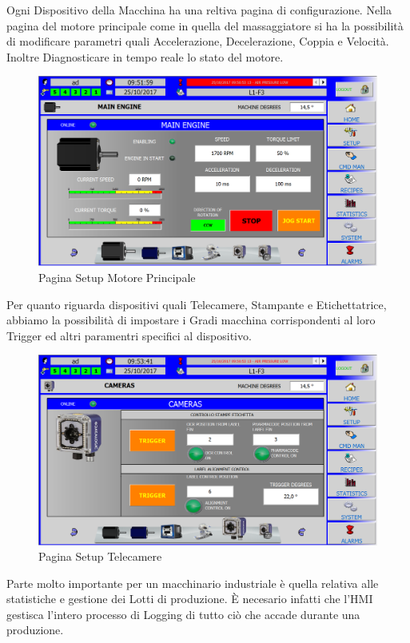 \documentclass[12pt, a4paper, oneside]{book}
\begin{document}
Ogni Dispositivo della Macchina ha una reltiva pagina di configurazione. Nella pagina del motore principale come in quella del massaggiatore si ha la possibilità di modificare parametri quali Accelerazione, Decelerazione, Coppia e Velocità. Inoltre Diagnosticare in tempo reale lo stato del motore.

\begin{figure}[H]
	\centering
	\includegraphics[width=13cm]{Immagini/HMI7}
	\caption{Pagina Setup Motore Principale}
	\label{HMI7}
\end{figure}

Per quanto riguarda dispositivi quali Telecamere, Stampante e Etichettatrice, abbiamo la possibilità di impostare i Gradi macchina corrispondenti al loro Trigger ed altri paramentri specifici al dispositivo.
\begin{figure}[H]
	\centering
	\includegraphics[width=13cm]{Immagini/HMI10}
	\caption{Pagina Setup Telecamere}
	\label{HMI10}
\end{figure}

Parte molto importante per un macchinario industriale è quella relativa alle statistiche e gestione dei Lotti di produzione. È necesario infatti che l'HMI gestisca l'intero processo di Logging di tutto ciò che accade durante una produzione. 
\end{document}
